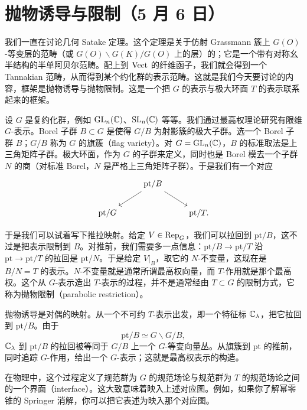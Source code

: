 \section[抛物诱导与限制]{抛物诱导与限制（5 月 6 日）}


我们一直在讨论几何 Satake 定理。这个定理是关于仿射 Grassmann 簇上 $G(O)$-等变层的范畴（或 $G(O)\backslash G(K)/G(O)$ 上的层）的；它是一个带有对称幺半结构的半单阿贝尔范畴。配上到 $\mathrm{Vect}$ 的纤维函子，我们就会得到一个 Tannakian 范畴，从而得到某个约化群的表示范畴。这就是我们今天要讨论的内容，框架是抛物诱导与抛物限制。这是一个把 $G$ 的表示与极大环面 $T$ 的表示联系起来的框架。

设 $G$ 是复约化群，例如 $\mathrm{GL}_n(\mathbb{C})$、$\mathrm{SL}_n(\mathbb{C})$ 等等。我们通过最高权理论研究有限维 $G$-表示。Borel 子群 $B\subset G$ 是使得 $G/B$ 为射影簇的极大子群。选一个 Borel 子群 $B$；$G/B$ 称为 $G$ 的旗簇（flag variety）。对 $G=\mathrm{GL}_n(\mathbb{C})$，$B$ 的标准取法是上三角矩阵子群。极大环面，作为 $G$ 的子群来定义，同时也是 Borel 模去一个子群 $N$ 的商（对标准 Borel，$N$ 是严格上三角矩阵子群）。于是我们有一个对应
\[
  \begin{tikzcd}
    & \mathrm{pt}/B \arrow[dl] \arrow[dr] & \\
    \mathrm{pt}/G & & \mathrm{pt}/T.
  \end{tikzcd}
\]

于是我们可以试着写下推拉映射。给定 $V\in\operatorname{Rep}_G$，我们可以拉回到 $\mathrm{pt}/B$，这不过是把表示限制到 $B$。对推前，我们需要多一点信息：$\mathrm{pt}/B\to\mathrm{pt}/T$ 沿 $\mathrm{pt}\to\mathrm{pt}/T$ 的拉回是 $\mathrm{pt}/N$。于是给定 $V|_B$，取它的 $N$-不变量，这现在是 $B/N=T$ 的表示。$N$-不变量就是通常所谓最高权向量，而 $T$-作用就是那个最高权。这个从 $G$-表示造出 $T$-表示的过程，并不是通常经由 $T\subset G$ 的限制方式，它称为抛物限制（parabolic restriction）。


抛物诱导是对偶的映射。从一个不可约 $T$-表示出发，即一个特征标 $\mathbb{C}_\lambda$，把它拉回到 $\mathrm{pt}/B$。由于
\[
  \mathrm{pt}/B\simeq G\backslash G/B,
\]
$\mathbb{C}_\lambda$ 到 $\mathrm{pt}/B$ 的拉回被等同于 $G/B$ 上一个 $G$-等变向量丛。从旗簇到 $\mathrm{pt}$ 的推前，同时追踪 $G$-作用，给出一个 $G$-表示；这就是最高权表示的构造。

在物理中，这个过程定义了规范群为 $G$ 的规范场论与规范群为 $T$ 的规范场论之间的一个界面（interface）。这大致意味着映入上述对应图。例如，如果你了解幂零锥的 Springer 消解，你可以把它表述为映入那个对应图。

